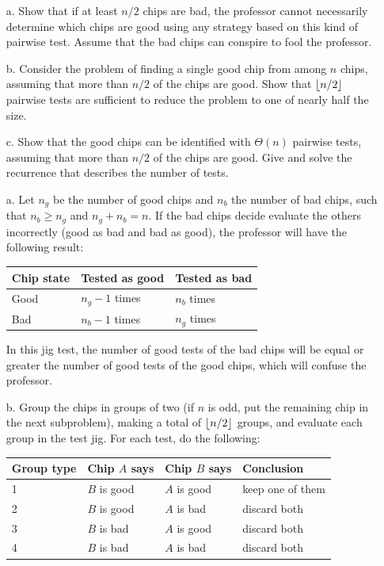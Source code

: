 \begin{enumerate}
{\begin{enumerate}
  \item[a.] Show that if at least $n/2$ chips are bad, the professor cannot
    necessarily determine which chips are good using any strategy based on this
    kind of pairwise test. Assume that the bad chips can conspire to fool the
    professor.
  \item[b.] Consider the problem of finding a single good chip from among
    $n$ chips, assuming that more than $n/2$ of the chips are good. Show that
    $\lfloor n/2\rfloor$ pairwise tests are sufficient to reduce the problem to one of
    nearly half the size.
  \item[c.] Show that the good chips can be identified with $\Theta(n)$ pairwise
    tests, assuming that more than $n/2$ of the chips are good. Give and solve
    the recurrence that describes the number of tests.
\end{enumerate}
}

\begin{framed}
  \begin{enumerate}
    \item[a.] Let $n_g$ be the number of good chips and $n_b$ the
      number of bad chips, such that $n_b \ge n_g$ and $n_g
      + n_b = n$. If the bad chips decide evaluate the others incorrectly
      (good as bad and bad as good), the professor will have the following
      result:

      \begin{tabular}{lll}
        Chip state & Tested as good & Tested as bad\\
        \toprule
        Good       & $n_g - 1$ times & $n_b$ times\\
        Bad        & $n_b - 1$ times & $n_g$ times\\
      \end{tabular}

      In this jig test, the number of good tests of the bad chips will be equal
      or greater the number of good tests of the good chips, which will confuse
      the professor.
    \item[b.] Group the chips in groups of two (if $n$ is odd, put the remaining
      chip in the next subproblem), making a total of $\lfloor n/2\rfloor$ groups, and
      evaluate each group in the test jig. For each test, do the following:

      \begin{tabular}{llll}
        Group type & Chip $A$ says & Chip $B$ says & Conclusion\\
        \toprule
        1 & $B$ is good & $A$ is good & keep one of them\\
        2 & $B$ is good & $A$ is bad  & discard both\\
        3 & $B$ is bad  & $A$ is good & discard both\\
        4 & $B$ is bad  & $A$ is bad  & discard both
      \end{tabular}


\end{enumerate}
\end{framed}
\end{enumerate}
